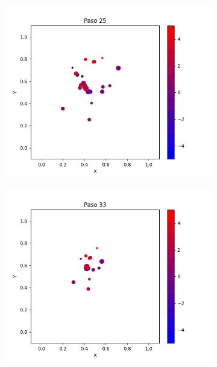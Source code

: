 \documentclass{report}
\begin{document}
\begin{figure}[h]
\begin{subfigure}[b]{0.3\textwidth}
         \includegraphics[width=\textwidth]{Images/Images_mc/p9pmc_t25.png}
     \end{subfigure}
     \begin{subfigure}[b]{0.3\textwidth}
         \centering
         \includegraphics[width=\textwidth]{Images/Images_mc/p9pmc_t33.png}
     \end{subfigure}
          \begin{subfigure}[b]{0.3\textwidth}
         \centering

\end{subfigure}
\end{figure}
\end{document}
